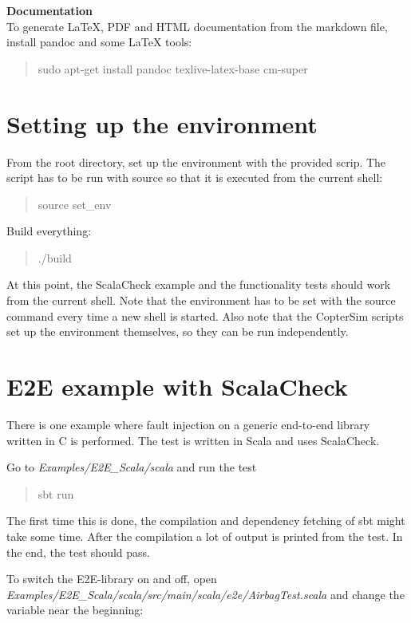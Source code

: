 \textbf{Documentation}\\To generate LaTeX, PDF and HTML documentation
from the markdown file, install pandoc and some LaTeX tools:

\begin{quote}
sudo apt-get install pandoc texlive-latex-base cm-super
\end{quote}

\section{Setting up the environment}\label{setting-up-the-environment}

From the root directory, set up the environment with the provided scrip.
The script has to be run with source so that it is executed from the
current shell:

\begin{quote}
source set\_env
\end{quote}

Build everything:

\begin{quote}
./build
\end{quote}

At this point, the ScalaCheck example and the functionality tests should
work from the current shell. Note that the environment has to be set
with the source command every time a new shell is started. Also note
that the CopterSim scripts set up the environment themselves, so they
can be run independently.

\section{E2E example with ScalaCheck}\label{e2e-example-with-scalacheck}

There is one example where fault injection on a generic end-to-end
library written in C is performed. The test is written in Scala and uses
ScalaCheck.

Go to \emph{Examples/E2E\_Scala/scala} and run the test

\begin{quote}
sbt run
\end{quote}

The first time this is done, the compilation and dependency fetching of
sbt might take some time. After the compilation a lot of output is
printed from the test. In the end, the test should pass.

To switch the E2E-library on and off, open
\emph{Examples/E2E\_Scala/scala/src/main/scala/e2e/AirbagTest.scala} and
change the variable near the beginning:

